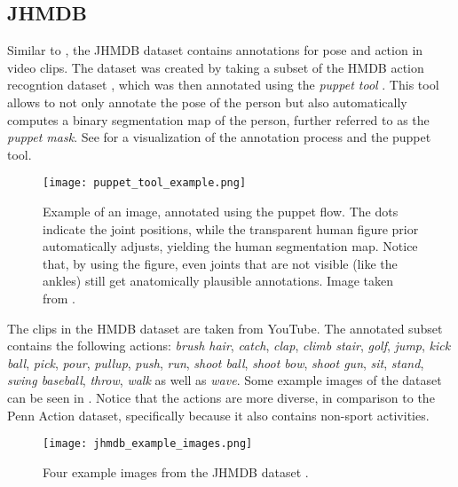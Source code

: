 \subsection{JHMDB}
\label{sec:exp-jhmdb}

Similar to \cite{zhang_actemes_2013} , the JHMDB dataset \cite{jhuang_towards_2013} contains annotations for pose and action in video clips.
The dataset was created by taking a subset of the HMDB action recogntion dataset \cite{kuehne_hmdb:_2011}, which was then annotated using the \textit{puppet tool} \cite{zuffi_pictorial_2012}.
This tool allows to not only annotate the pose of the person but also automatically computes a binary segmentation map of the person, further referred to as the \textit{puppet mask}.
See  for a visualization of the annotation process and the puppet tool.

\begin{figure}[htb!]
    \centering
    \texttt{[image: puppet\_tool\_example.png]}
    \caption{Example of an image, annotated using the puppet flow. The dots indicate the joint positions, while the transparent human figure prior automatically adjusts, yielding the human segmentation map. Notice that, by using the figure, even joints that are not visible (like the ankles) still get anatomically plausible annotations. Image taken from \cite{max_planck_institute_for_intelligent_systems_jhmdb_nodate}.}
    \label{fig:puppet_tool_example}
\end{figure}

The clips in the HMDB dataset are taken from YouTube.
The annotated subset contains the following actions:
\textit{brush hair}, \textit{catch}, \textit{clap}, \textit{climb stair}, \textit{golf}, \textit{jump}, \textit{kick ball}, \textit{pick}, \textit{pour}, \textit{pullup}, \textit{push}, \textit{run}, \textit{shoot ball}, \textit{shoot bow}, \textit{shoot gun}, \textit{sit}, \textit{stand}, \textit{swing baseball}, \textit{throw}, \textit{walk} as well as \textit{wave}.
Some example images of the dataset can be seen in .
Notice that the actions are more diverse, in comparison to the Penn Action dataset, specifically because it also contains non-sport activities.

\begin{figure}[htb!]
    \centering
    \texttt{[image: jhmdb\_example\_images.png]}
    \caption{Four example images from the JHMDB dataset \cite{jhuang_towards_2013}. }
    \label{fig:jhmdb_example_images}
\end{figure}

